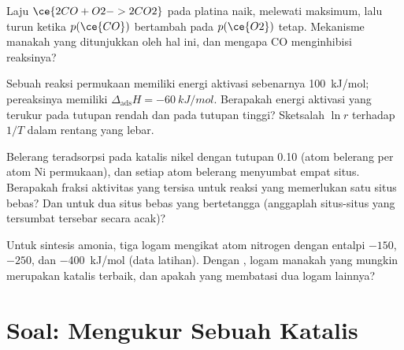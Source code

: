 \begin{exercise}[$\star\star$]\label{exo:b3:surfaces-catalysis:9}
Laju $\ce{2 CO + O2 -> 2 CO2}$ pada platina naik, melewati maksimum, lalu turun ketika $p(\ce{CO})$
bertambah pada $p(\ce{O2})$ tetap. Mekanisme manakah yang ditunjukkan oleh hal ini, dan mengapa CO
menginhibisi reaksinya?
\end{exercise}

\begin{exercise}[$\star\star\star$]\label{exo:b3:surfaces-catalysis:10}
Sebuah reaksi permukaan memiliki energi aktivasi sebenarnya \qty{100}{kJ/mol}; pereaksinya memiliki
$\Delta_{\mathrm{ads}}H = \qty{-60}{kJ/mol}$. Berapakah energi aktivasi yang terukur pada tutupan rendah dan pada tutupan
tinggi? Sketsalah $\ln r$ terhadap $1/T$ dalam rentang yang lebar.
\end{exercise}

\begin{exercise}[$\star\star\star$]\label{exo:b3:surfaces-catalysis:11}
Belerang teradsorpsi pada katalis nikel dengan tutupan 0.10 (atom belerang per
atom Ni permukaan), dan setiap atom belerang menyumbat empat situs. Berapakah
fraksi aktivitas yang tersisa untuk reaksi yang memerlukan satu situs bebas? Dan
untuk dua situs bebas yang bertetangga (anggaplah situs-situs yang tersumbat
tersebar secara acak)?
\end{exercise}

\begin{exercise}[$\star\star\star$]\label{exo:b3:surfaces-catalysis:12}
Untuk sintesis amonia, tiga logam mengikat atom nitrogen dengan entalpi
$-150$, $-250$, dan \qty{-400}{kJ/mol} (data latihan). Dengan ,
logam manakah yang mungkin merupakan katalis terbaik, dan apakah yang membatasi dua logam lainnya?
\end{exercise}

\section{Soal: Mengukur Sebuah Katalis}

